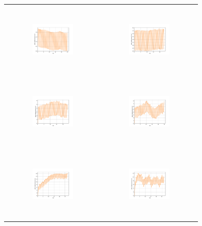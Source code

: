 \begin{figure}[H]
\begin{center}
\begin{tabular}{cc}
\includegraphics[width=0.45\textwidth, height=3.5cm]{graph/omega=2.50_A=1_plate.pdf}
&
\includegraphics[width=0.45\textwidth, height=3.5cm]{graph/omega=2.50_A=2_plate.pdf}\\
\includegraphics[width=0.45\textwidth, height=3.5cm]{graph/omega=2.50_A=3_plate.pdf}
&
\includegraphics[width=0.45\textwidth, height=3.5cm]{graph/omega=2.50_A=4_plate.pdf}\\
\includegraphics[width=0.45\textwidth, height=3.5cm]{graph/omega=2.50_A=5_plate.pdf}
&
\includegraphics[width=0.45\textwidth, height=3.5cm]{graph/omega=2.50_A=6_plate.pdf}\\

\end{tabular}
\end{center}
\end{figure}
